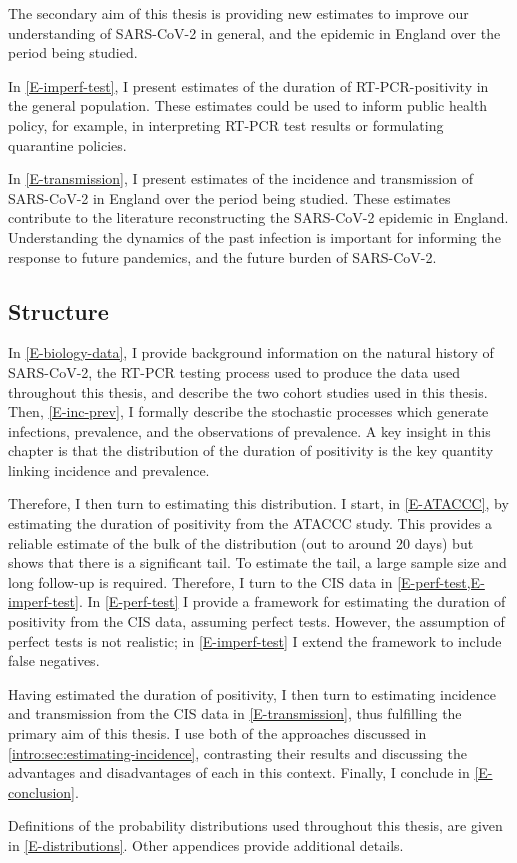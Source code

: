 \documentclass[thesis.tex]{subfiles}
\begin{document}
The secondary aim of this thesis is providing new estimates to improve our understanding of SARS-CoV-2 in general, and the epidemic in England over the period being studied.

In \cref{E-imperf-test}, I present estimates of the duration of RT-PCR-positivity in the general population.
These estimates could be used to inform public health policy, for example, in interpreting RT-PCR test results or formulating quarantine policies.

In \cref{E-transmission}, I present estimates of the incidence and transmission of SARS-CoV-2 in England over the period being studied.
These estimates contribute to the literature reconstructing the SARS-CoV-2 epidemic in England.
Understanding the dynamics of the past infection is important for informing the response to future pandemics, and the future burden of SARS-CoV-2.

\subsection{Structure}

In \cref{E-biology-data}, I provide background information on the natural history of SARS-CoV-2, the RT-PCR testing process used to produce the data used throughout this thesis, and describe the two cohort studies used in this thesis.
Then, \cref{E-inc-prev}, I formally describe the stochastic processes which generate infections, prevalence, and the observations of prevalence.
A key insight in this chapter is that the distribution of the duration of positivity is the key quantity linking incidence and prevalence.

Therefore, I then turn to estimating this distribution.
I start, in \cref{E-ATACCC}, by estimating the duration of positivity from the ATACCC study.
This provides a reliable estimate of the bulk of the distribution (out to around 20 days) but shows that there is a significant tail.
To estimate the tail, a large sample size and long follow-up is required.
Therefore, I turn to the CIS data in \cref{E-perf-test,E-imperf-test}.
In \cref{E-perf-test} I provide a framework for estimating the duration of positivity from the CIS data, assuming perfect tests.
However, the assumption of perfect tests is not realistic; in \cref{E-imperf-test} I extend the framework to include false negatives.

Having estimated the duration of positivity, I then turn to estimating incidence and transmission from the CIS data in \cref{E-transmission}, thus fulfilling the primary aim of this thesis.
I use both of the approaches discussed in \cref{intro:sec:estimating-incidence}, contrasting their results and discussing the advantages and disadvantages of each in this context.
Finally, I conclude in \cref{E-conclusion}.

Definitions of the probability distributions used throughout this thesis, are given in \cref{E-distributions}.
Other appendices provide additional details.

\ifSubfilesClassLoaded{
  \appendix
  
  \listoftodos
}{}
\end{document}
